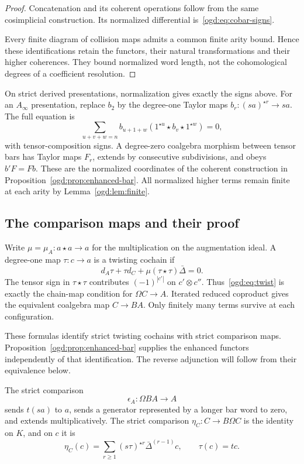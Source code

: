 \begin{proof}
Concatenation and its coherent operations follow from the same cosimplicial construction.
Its normalized differential is~\eqref{ogd:eq:cobar-signs}.

Every finite diagram of collision maps admits a common finite arity bound.
Hence these identifications retain the functors, their natural transformations and their higher coherences.
They bound normalized word length, not the cohomological degrees of a coefficient resolution.
\end{proof}

On strict derived presentations, normalization gives exactly the signs above.
For an \(A_\infty\) presentation, replace \(b_2\) by the degree-one Taylor maps
\(b_r:(sa)^{\star r}\to sa\).
The full equation is
\[
 \sum_{u+v+w=n}b_{u+1+w}
 (1^{\star u}\star b_v\star1^{\star w})=0,
\]
with tensor-composition signs.
A degree-zero coalgebra morphism between tensor bars has Taylor maps \(F_r\), extends by consecutive subdivisions, and obeys \(b'F=Fb\).
These are the normalized coordinates of the coherent construction in
Proposition~\ref{ogd:prop:enhanced-bar}.
All normalized higher terms remain finite at each arity by Lemma~\ref{ogd:lem:finite}.

\subsection{The comparison maps and their proof}

Write\label{ogd:def:twisting-cochain-data} \(\mu=\mu_A:a\star a\to a\) for the multiplication on the augmentation ideal.
A degree-one map \(\tau:c\to a\) is a twisting cochain if
\begin{equation}\label{ogd:eq:twist}
 d_A\tau+\tau d_C+\mu(\tau\star\tau)\bar\Delta=0.
\end{equation}
The tensor sign in \(\tau\star\tau\) contributes \((-1)^{|c'|}\) on \(c'\otimes c''\).
Thus~\eqref{ogd:eq:twist} is exactly the chain-map condition for \(\Omega C\to A\).
Iterated reduced coproduct gives the equivalent coalgebra map \(C\to BA\).
Only finitely many terms survive at each configuration.

These formulas identify strict twisting cochains with strict comparison maps.
Proposition~\ref{ogd:prop:enhanced-bar} supplies the enhanced functors independently of that identification.
The reverse adjunction will follow from their equivalence below.

The strict comparison
\[
 \epsilon_A:\Omega BA\longrightarrow A
\]
sends \(t(sa)\) to \(a\), sends a generator represented by a longer bar word to zero, and extends multiplicatively.
The strict comparison \(\eta_C:C\to B\Omega C\) is the identity on \(K\), and on \(c\) it is
\begin{equation}\label{ogd:eq:unit}
 \eta_C(c)=\sum_{r\geq1}(s\tau)^{\star r}\bar\Delta^{(r-1)}c,
 \qquad \tau(c)=tc.
\end{equation}

